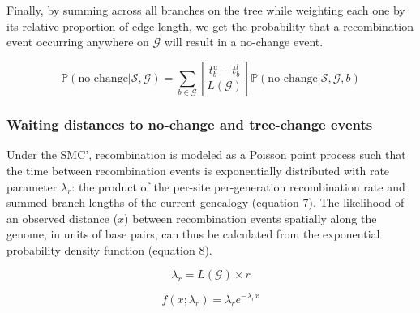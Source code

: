\documentclass[11pt]{article}
\begin{document}
\noindent Finally, by summing across all branches on the tree 
while weighting each one by its relative proportion of edge length,
we get the probability that a recombination event occurring anywhere on 
$\mathcal{G}$ will result in a no-change event. %

\begin{equation}
	\mathbb{P}(\text{no-change} | \mathcal{S},\mathcal{G}) = 
	\sum_{b \in \mathcal{G}}
	\left[\frac{t^u_b - t^l_b}{L(\mathcal{G})}\right]
	\mathbb{P}(\text{no-change} | \mathcal{S},\mathcal{G},b)
\end{equation}


\subsubsection{Waiting distances to no-change and tree-change events}
Under the SMC', recombination is modeled as a Poisson point process 
such that the time between recombination events is exponentially distributed 
with rate parameter $\lambda_r$: the product of the per-site
per-generation recombination rate and summed branch lengths of
the current genealogy \citep{wiuf_ancestry_1999} (equation 7).
The likelihood of an observed distance ($x$) between recombination
events spatially along the genome, in units of base pairs, can thus 
be calculated from the exponential probability density function 
(equation 8).


\begin{equation}
	\lambda_{r} = L(\mathcal{G}) \times r
\end{equation}


\begin{equation}
	f(x; \lambda_r) = \lambda_r e^{-\lambda_r x}
\end{equation}
\end{document}
